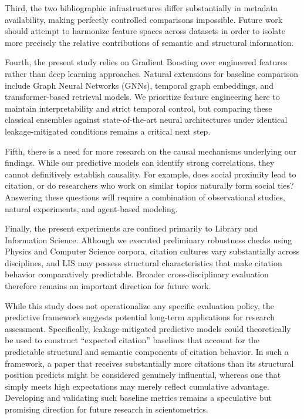 \documentclass[11pt,a4paper]{article}
\begin{document}
Third, the two bibliographic infrastructures differ substantially in metadata availability, making perfectly controlled comparisons impossible. Future work should attempt to harmonize feature spaces across datasets in order to isolate more precisely the relative contributions of semantic and structural information.

Fourth, the present study relies on Gradient Boosting over engineered features rather than deep learning approaches. Natural extensions for baseline comparison include Graph Neural Networks (GNNs), temporal graph embeddings, and transformer-based retrieval models. We prioritize feature engineering here to maintain interpretability and strict temporal control, but comparing these classical ensembles against state-of-the-art neural architectures under identical leakage-mitigated conditions remains a critical next step.

Fifth, there is a need for more research on the causal mechanisms underlying our findings. While our predictive models can identify strong correlations, they cannot definitively establish causality. For example, does social proximity lead to citation, or do researchers who work on similar topics naturally form social ties? Answering these questions will require a combination of observational studies, natural experiments, and agent-based modeling.

Finally, the present experiments are confined primarily to Library and Information Science. Although we executed preliminary robustness checks using Physics and Computer Science corpora, citation cultures vary substantially across disciplines, and LIS may possess structural characteristics that make citation behavior comparatively predictable. Broader cross-disciplinary evaluation therefore remains an important direction for future work.

While this study does not operationalize any specific evaluation policy, the predictive framework suggests potential long-term applications for research assessment. Specifically, leakage-mitigated predictive models could theoretically be used to construct ``expected citation'' baselines that account for the predictable structural and semantic components of citation behavior. In such a framework, a paper that receives substantially more citations than its structural position predicts might be considered genuinely influential, whereas one that simply meets high expectations may merely reflect cumulative advantage. Developing and validating such baseline metrics remains a speculative but promising direction for future research in scientometrics.
\end{document}
